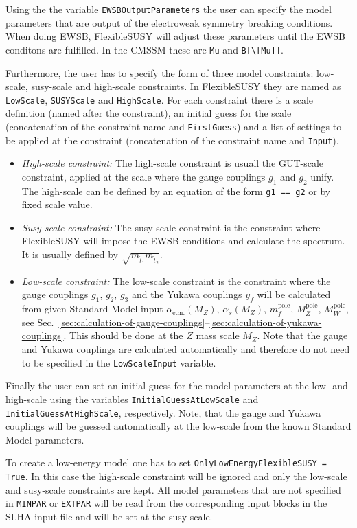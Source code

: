 \documentclass[final,3p,times,pdflatex]{elsarticle}
\newcommand{\fs}{FlexibleSUSY\xspace}
\newcommand{\code}[1]{\lstinline|#1|}  %
\newcommand{\pole}{\text{pole}}
\begin{document}
Using the the variable \code{EWSBOutputParameters} the user can
specify the model parameters that are output of the electroweak
symmetry breaking conditions.  When doing EWSB, \fs will adjust these
parameters until the EWSB conditons are fulfilled.  In the CMSSM these
are \code{Mu} and \code{B[\[Mu]]}.

Furthermore, the user has to specify the form of three model
constraints: low-scale, susy-scale and high-scale constraints.  In \fs
they are named as \code{LowScale}, \code{SUSYScale} and
\code{HighScale}.  For each constraint there is a scale definition
(named after the constraint), an initial guess for the scale
(concatenation of the constraint name and \code{FirstGuess}) and a
list of settings to be applied at the constraint (concatenation of the
constraint name and \code{Input}).
%
\begin{itemize}
\item \emph{High-scale constraint:} The high-scale constraint is
  usuall the GUT-scale constraint, applied at the scale where the
  gauge couplings $g_1$ and $g_2$ unify.  The high-scale can be
  defined by an equation of the form \code{g1 == g2} or by fixed scale
  value.
\item \emph{Susy-scale constraint:} The susy-scale constraint is the
  constraint where \fs will impose the EWSB conditions and calculate
  the spectrum.  It is usually defined by
  $\sqrt{m_{\tilde{t}_1}m_{\tilde{t}_2}}$.
\item \emph{Low-scale constraint:} The low-scale constraint is the
  constraint where the gauge couplings $g_1$, $g_2$, $g_3$ and the
  Yukawa couplings $y_f$ will be calculated from given Standard Model
  input $\alpha_{\text{e.m.}}(M_Z)$, $\alpha_{s}(M_Z)$, $m_f^\pole$,
  $M_Z^\pole$, $M_W^\pole$, see
  Sec.~\ref{sec:calculation-of-gauge-couplings}--\ref{sec:calculation-of-yukawa-couplings}.
  This should be done at the $Z$ mass scale $M_Z$.  Note that the
  gauge and Yukawa couplings are calculated automatically and
  therefore do not need to be specified in the \code{LowScaleInput}
  variable.
\end{itemize}

Finally the user can set an initial guess for the model parameters at
the low- and high-scale using the variables
\code{InitialGuessAtLowScale} and \code{InitialGuessAtHighScale},
respectively.  Note, that the gauge and Yukawa couplings will be
guessed automatically at the low-scale from the known Standard Model
parameters.

To create a low-energy model one has to set
\code{OnlyLowEnergyFlexibleSUSY = True}.  In this case the high-scale
constraint will be ignored and only the low-scale and susy-scale
constraints are kept.  All model parameters that are not specified in
\code{MINPAR} or \code{EXTPAR} will be read from the corresponding
input blocks in the SLHA input file and will be set at the susy-scale.
\end{document}
